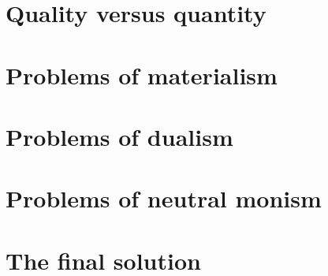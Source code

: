 \section{Quality versus quantity}







\section{Problems of materialism}



\section{Problems of dualism}



\section{Problems of neutral monism}


\section{The final solution}

